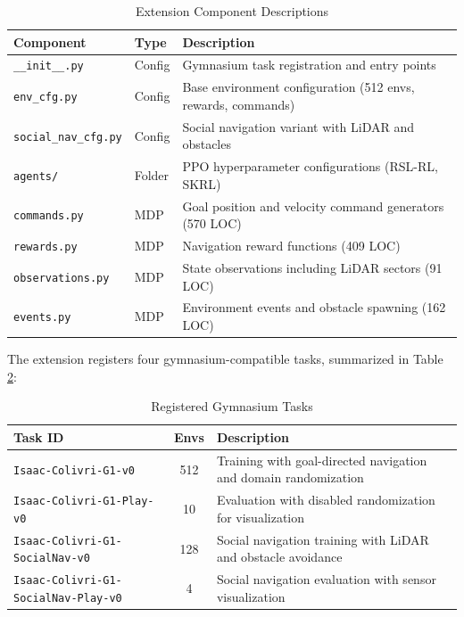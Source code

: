 \documentclass[12pt,a4paper]{article}
\begin{document}
\begin{table}[H]
\centering
\caption{Extension Component Descriptions}
\label{tab:extension_components}
\footnotesize
\begin{tabular}{l|l|p{7cm}}
\hline
\textbf{Component} & \textbf{Type} & \textbf{Description} \\
\hline
\hline
\texttt{\_\_init\_\_.py} & Config & Gymnasium task registration and entry points \\
\hline
\texttt{env\_cfg.py} & Config & Base environment configuration (512 envs, rewards, commands) \\
\hline
\texttt{social\_nav\_cfg.py} & Config & Social navigation variant with LiDAR and obstacles \\
\hline
\texttt{agents/} & Folder & PPO hyperparameter configurations (RSL-RL, SKRL) \\
\hline
\texttt{commands.py} & MDP & Goal position and velocity command generators (570 LOC) \\
\hline
\texttt{rewards.py} & MDP & Navigation reward functions (409 LOC) \\
\hline
\texttt{observations.py} & MDP & State observations including LiDAR sectors (91 LOC) \\
\hline
\texttt{events.py} & MDP & Environment events and obstacle spawning (162 LOC) \\
\hline
\end{tabular}
\end{table}

The extension registers four gymnasium-compatible tasks, summarized in Table \ref{tab:registered_tasks}:

\begin{table}[H]
\centering
\caption{Registered Gymnasium Tasks}
\label{tab:registered_tasks}
\footnotesize
\begin{tabular}{l|c|p{6.5cm}}
\hline
\textbf{Task ID} & \textbf{Envs} & \textbf{Description} \\
\hline
\hline
\texttt{Isaac-Colivri-G1-v0} & 512 & Training with goal-directed navigation and domain randomization \\
\hline
\texttt{Isaac-Colivri-G1-Play-v0} & 10 & Evaluation with disabled randomization for visualization \\
\hline
\texttt{Isaac-Colivri-G1-SocialNav-v0} & 128 & Social navigation training with LiDAR and obstacle avoidance \\
\hline
\texttt{Isaac-Colivri-G1-SocialNav-Play-v0} & 4 & Social navigation evaluation with sensor visualization \\
\hline
\end{tabular}
\end{table}
\end{document}
